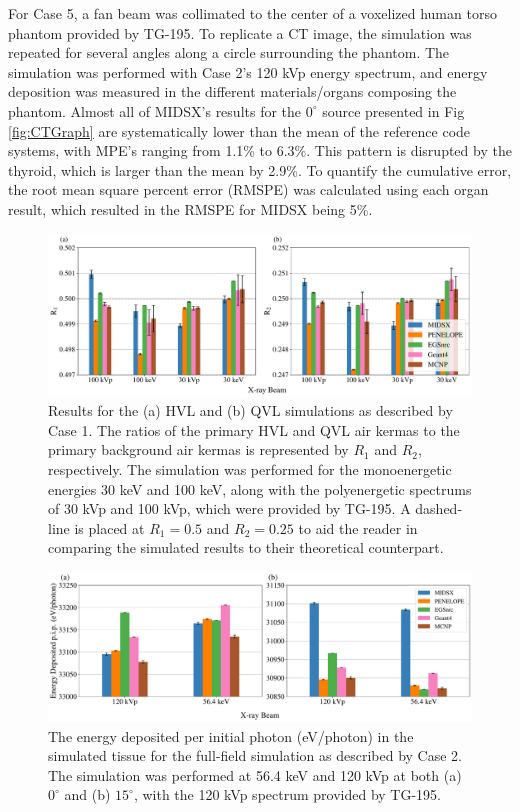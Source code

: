 \par For Case 5, a fan beam was collimated to the center of a voxelized human torso phantom provided by TG-195. To replicate a CT image, the simulation was repeated for several angles along a circle surrounding the phantom. The simulation was performed with Case 2's 120 kVp energy spectrum, and energy deposition was measured in the different materials/organs composing the phantom. Almost all of MIDSX's results for the $0^\circ$ source presented in Fig \ref{fig:CTGraph} are systematically lower than the mean of the reference code systems, with MPE's ranging from 1.1\% to 6.3\%. This pattern is disrupted by the thyroid, which is larger than the mean by 2.9\%. To quantify the cumulative error, the root mean square percent error (RMSPE) was calculated using each organ result, which resulted in the RMSPE for MIDSX being 5\%.   


\begin{figure}[htbp!]
    \centering
	\includegraphics[width=1.0\textwidth]{../figures/HVL_and_QVL_paper_ready.pdf}
	\caption{Results for the (a) HVL and (b) QVL simulations as described by Case 1. The ratios of the primary HVL and QVL air kermas to the primary background air kermas is represented by $R_1$ and $R_2$, respectively. The simulation was performed for the monoenergetic energies 30 keV and 100 keV, along with the polyenergetic spectrums of 30 kVp and 100 kVp, which were provided by TG-195. A dashed-line is placed at $R_1 = 0.5$ and $R_2 = 0.25$ to aid the reader in comparing the simulated results to their theoretical counterpart.}
	\label{fig:HVLGraph}
\end{figure}

\begin{figure}[H]
    \centering
	\includegraphics[width=1.0\textwidth]{../figures/radiography_body_dep_paper_ready.pdf}
	\caption{The energy deposited per initial photon (eV/photon) in the simulated tissue for the full-field simulation as described by Case 2. The simulation was performed at 56.4 keV and 120 kVp at both (a) $0^\circ$ and (b) $15^\circ$, with the 120 kVp spectrum provided by TG-195.}
 	\label{fig:BDGraph}
\end{figure}


